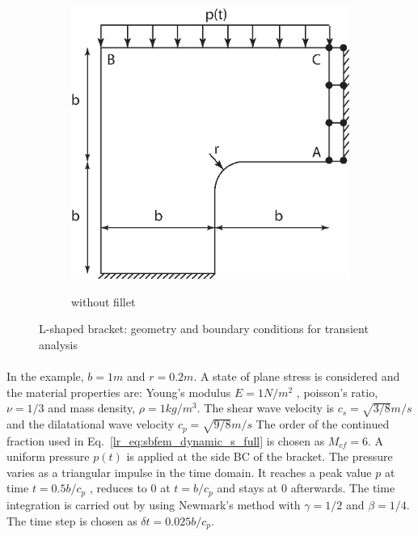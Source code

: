 \begin{figure}
\begin{subfigure}[b]{1\linewidth}
{                \includegraphics{isogeometric_sbfem/images/l_with_fillet_dynamic_geo_bc.eps}
            }
            \caption{without fillet}
        \end{subfigure}
        \caption{L-shaped bracket: geometry and boundary conditions for transient analysis}
        \label{iso_fig:l_dynamic_geo_bc}
    \end{figure}
%
\paragraph{}
In the example, $b=1m$ and $r=0.2m$.
A state of plane stress is considered and the material properties are:
    Young’s modulus $E = 1 N/m^2$ , poisson’s ratio, $\nu = 1/3$ and mass density, $\rho = 1 kg/m^3$.
    The shear wave velocity is $c_s=\sqrt{3/8}m/s$ and the dilatational wave velocity $c_p=\sqrt{9/8}m/s$
The order of the continued fraction used in Eq.~\ref{lr_eq:sbfem_dynamic_s_full} is chosen as $M_{cf} = 6$.
A uniform pressure $p(t)$ is applied at the side BC of the bracket.
The pressure varies as a triangular impulse in the time domain.
It reaches a peak value $p$ at time $t= 0.5b/c_p$ , reduces to $0$ at $t = b/c_p$ and stays at $0$ afterwards.
The time integration is carried out by using Newmark's method with $\gamma = 1/2$ and $\beta = 1/4$.
The time step is chosen as $\delta t = 0.025b/c_p$.

